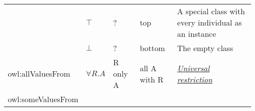 \documentclass[a4paper,]{report}
\begin{document}
\begin{longtable}[]{@{}lllll@{}}
\begin{minipage}[t]{0.18\columnwidth}
\strut
\end{minipage} & \begin{minipage}[t]{0.16\columnwidth}\raggedright
\(\top\)\strut
\end{minipage} & \begin{minipage}[t]{0.17\columnwidth}\raggedright
?\strut
\end{minipage} & \begin{minipage}[t]{0.20\columnwidth}\raggedright
top\strut
\end{minipage} & \begin{minipage}[t]{0.14\columnwidth}\raggedright
A special class with every individual as an instance\strut
\end{minipage}\tabularnewline
\begin{minipage}[t]{0.18\columnwidth}\raggedright
\strut
\end{minipage} & \begin{minipage}[t]{0.16\columnwidth}\raggedright
\(\bot\)\strut
\end{minipage} & \begin{minipage}[t]{0.17\columnwidth}\raggedright
?\strut
\end{minipage} & \begin{minipage}[t]{0.20\columnwidth}\raggedright
bottom\strut
\end{minipage} & \begin{minipage}[t]{0.14\columnwidth}\raggedright
The empty class\strut
\end{minipage}\tabularnewline
\begin{minipage}[t]{0.18\columnwidth}\raggedright
owl:allValuesFrom\strut
\end{minipage} & \begin{minipage}[t]{0.16\columnwidth}\raggedright
\(\forall R.A\)\strut
\end{minipage} & \begin{minipage}[t]{0.17\columnwidth}\raggedright
R only A\strut
\end{minipage} & \begin{minipage}[t]{0.20\columnwidth}\raggedright
all A with R\strut
\end{minipage} & \begin{minipage}[t]{0.14\columnwidth}\raggedright
\href{https://en.wikipedia.org/wiki/Universal_quantifier}{\emph{Universal
restriction}}\strut
\end{minipage}\tabularnewline
\begin{minipage}[t]{0.18\columnwidth}\raggedright
owl:someValuesFrom\strut

\end{minipage}
\end{longtable}
\end{document}
